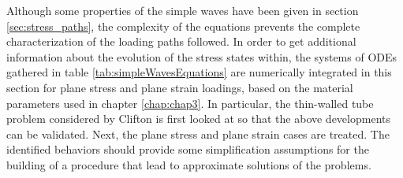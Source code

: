 Although some properties of the simple waves have been given in section \ref{sec:stress_paths}, the complexity of the equations prevents the complete characterization of the loading paths followed.
In order to get additional information about the evolution of the stress states within, the systems of ODEs gathered in table \ref{tab:simpleWavesEquations} are numerically integrated in this section for plane stress and plane strain loadings, based on the material parameters used in chapter \ref{chap:chap3}.
In particular, the thin-walled tube problem considered by Clifton \cite{Clifton} is first looked at so that the above developments can be validated.
Next, the plane stress and plane strain cases are treated.
The identified behaviors should provide some simplification assumptions for the building of a procedure that lead to approximate solutions of the problems.


